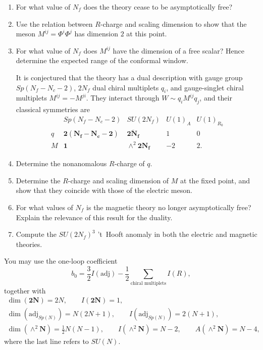 \begin{enumerate}
\begin{enumerate}
    \item[(ii)]
    For what value of \(N_f\) does the theory cease to be asymptotically
    free?

    \item[(iii)]
    Use the relation between \(R\)-charge and scaling dimension to show that
    the meson \(M^{ij}=\Phi^i\Phi^j\) has dimension \(2\) at this point.

    \item[(iv)]
    For what value of \(N_f\) does \(M^{ij}\) have the dimension of a free
    scalar?  Hence determine the expected range of the conformal window.

    It is conjectured that the theory has a dual description with gauge
    group \(Sp(N_f-N_c-2)\), \(2N_f\) dual chiral multiplets \(q_i\), and
    gauge-singlet chiral multiplets \(M^{ij}=-M^{ji}\).  They interact
    through \(W\sim q_iM^{ij}q_j\), and their classical symmetries are
    \[
    \begin{array}{c|cccc}
       &Sp(N_f-N_c-2)&SU(2N_f)&U(1)_A&U(1)_{R_0}\\ \hline
      q&\boldsymbol{2(N_f-N_c-2)}
        &\overline{\boldsymbol{2N_f}}&1&0\\
      M&\boldsymbol1&\wedge^2\boldsymbol{2N_f}&-2&2 .
    \end{array}
    \tag{29.10.3}
    \]

    \item[(v)]
    Determine the nonanomalous \(R\)-charge of \(q\).

    \item[(vi)]
    Determine the \(R\)-charge and scaling dimension of \(M\) at the fixed
    point, and show that they coincide with those of the electric meson.

    \item[(vii)]
    For what values of \(N_f\) is the magnetic theory no longer
    asymptotically free?  Explain the relevance of this result for the
    duality.

    \item[(viii)]
    Compute the \(SU(2N_f)^3\) 't~Hooft anomaly in both the electric and
    magnetic theories.
  \end{enumerate}

  You may use the one-loop coefficient
  \[
    b_0=\frac32 I(\mathrm{adj})
      -\frac12\sum_{\text{chiral multiplets}} I(R),
    \tag{29.10.4}
  \]
  together with
  \[
  \begin{gathered}
    \dim(\boldsymbol{2N})=2N,\qquad I(\boldsymbol{2N})=1,\\
    \dim(\mathrm{adj}_{Sp(N)})=N(2N+1),\qquad
    I(\mathrm{adj}_{Sp(N)})=2(N+1),\\
    \dim(\wedge^2\boldsymbol N)=\frac12N(N-1),\qquad
    I(\wedge^2\boldsymbol N)=N-2,\qquad
    A(\wedge^2\boldsymbol N)=N-4,
  \end{gathered}
  \tag{29.10.5}
  \]
  where the last line refers to \(SU(N)\).


\end{enumerate}
